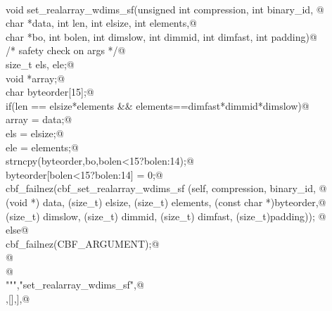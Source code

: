\documentclass[10pt,a4paper,twoside,notitlepage]{article}
\begin{document}
\begin{flushleft}
\begin{list}{}{}
\mbox{}\verb@%apply (char *STRING, int LENGTH) { (char *data, int len) } set_realarray_wdims_sf;@\\
\mbox{}\verb@%apply (char *STRING, int LENGTH) { (char *bo, int bolen) } set_realarray_wdims_sf;@\\
\mbox{}\verb@@\\
\mbox{}\verb@    void set_realarray_wdims_sf(unsigned int compression, int binary_id, @\\
\mbox{}\verb@             char *data, int len, int elsize, int elements,@\\
\mbox{}\verb@             char *bo, int bolen, int dimslow, int dimmid, int dimfast, int padding){@\\
\mbox{}\verb@        /* safety check on args */@\\
\mbox{}\verb@        size_t els, ele;@\\
\mbox{}\verb@        void *array;@\\
\mbox{}\verb@        char byteorder[15];@\\
\mbox{}\verb@        if(len == elsize*elements && elements==dimfast*dimmid*dimslow){@\\
\mbox{}\verb@           array = data;@\\
\mbox{}\verb@           els = elsize;@\\
\mbox{}\verb@           ele = elements;@\\
\mbox{}\verb@           strncpy(byteorder,bo,bolen<15?bolen:14);@\\
\mbox{}\verb@           byteorder[bolen<15?bolen:14] = 0;@\\
\mbox{}\verb@           cbf_failnez(cbf_set_realarray_wdims_sf (self, compression, binary_id, @\\
\mbox{}\verb@           (void *) data,  (size_t) elsize, (size_t) elements, (const char *)byteorder,@\\
\mbox{}\verb@           (size_t) dimslow, (size_t) dimmid, (size_t) dimfast, (size_t)padding)); @\\
\mbox{}\verb@        }else{@\\
\mbox{}\verb@           cbf_failnez(CBF_ARGUMENT);@\\
\mbox{}\verb@        }@\\
\mbox{}\verb@    }@\\
\mbox{}\verb@""","set_realarray_wdims_sf",@\\
\mbox{},[],],@\\

\end{list}
\end{flushleft}
\end{document}
